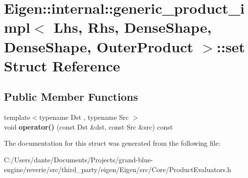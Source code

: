 \hypertarget{struct_eigen_1_1internal_1_1generic__product__impl_3_01_lhs_00_01_rhs_00_01_dense_shape_00_01_de53b08926de0225703046b27d8aadeb7a}{}\section{Eigen\+::internal\+::generic\+\_\+product\+\_\+impl$<$ Lhs, Rhs, Dense\+Shape, Dense\+Shape, Outer\+Product $>$\+::set Struct Reference}
\label{struct_eigen_1_1internal_1_1generic__product__impl_3_01_lhs_00_01_rhs_00_01_dense_shape_00_01_de53b08926de0225703046b27d8aadeb7a}
\subsection*{Public Member Functions}
\begin{DoxyCompactItemize}
\item 
\mbox{\label{struct_eigen_1_1internal_1_1generic__product__impl_3_01_lhs_00_01_rhs_00_01_dense_shape_00_01_de53b08926de0225703046b27d8aadeb7a_a7dca142c70d99e6e1c3c5264b25b9c94}} 
{\footnotesize template$<$typename Dst , typename Src $>$ }\\void {\bfseries operator()} (const Dst \&dst, const Src \&src) const
\end{DoxyCompactItemize}


The documentation for this struct was generated from the following file\+:\begin{DoxyCompactItemize}
\item 
C\+:/\+Users/dante/\+Documents/\+Projects/grand-\/blue-\/engine/reverie/src/third\+\_\+party/eigen/\+Eigen/src/\+Core/Product\+Evaluators.\+h\end{DoxyCompactItemize}
